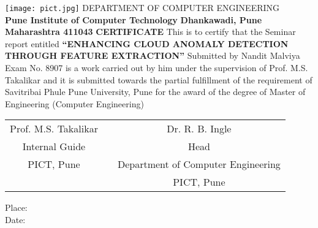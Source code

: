 \documentclass[a4paper, 12pt]{article}
\begin{document}
\begin{titlepage}
\begin{center}
	\texttt{[image: pict.jpg]} 
	\linebreak
	\Large
        DEPARTMENT OF COMPUTER ENGINEERING\\
        \textbf{Pune Institute of Computer Technology}
		\linebreak
		\textbf{Dhankawadi, Pune}
		\linebreak
		\textbf{Maharashtra 411043}
		\linebreak
		\linebreak
		\Large
	    \textbf{CERTIFICATE}
	    \linebreak
		 This is to certify that the Seminar report entitled
		\large
		\textbf{“ENHANCING CLOUD ANOMALY DETECTION THROUGH FEATURE EXTRACTION”}
		\linebreak
		\linebreak
		Submitted by
		\linebreak
		Nandit Malviya \hspace{10mm}   Exam No. 8907 \linebreak
		\linebreak
		is a work carried out by him under the supervision of Prof. M.S. Takalikar and it is submitted towards the partial fulfillment of the requirement of Savitribai Phule Pune University, Pune for the award of the degree of Master of Engineering (Computer Engineering)
		\linebreak
		\linebreak
		\linebreak
		\linebreak
		\linebreak
		\begin{table}[h]
		\begin{tabular}{ccc}
		Prof. M.S. Takalikar    &                        &  \hspace{52mm} Dr. R. B. Ingle\\
		Internal Guide      &                     &    \hspace{52mm} Head \\
		PICT, Pune          &                         &       \hspace{47mm} Department of Computer Engineering \\
                    &                       & \hspace{52mm} PICT, Pune
		\end{tabular}
		\end{table}
		\end{center}
Place:\\
Date:

\end{titlepage} 
\end{document}
